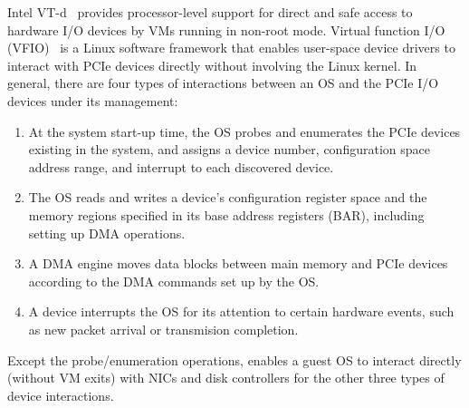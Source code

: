 Intel VT-d~\cite{intelvtd-paper} provides processor-level support for direct 
and safe access to hardware I/O devices by VMs running in non-root mode.
Virtual function I/O (VFIO)~\cite{vfio} is a Linux software framework that enables user-space
device drivers to interact with PCIe devices directly without involving the Linux kernel. 
In general, there are four types of interactions between an OS and the PCIe 
I/O devices under its management:
\begin{enumerate} 
\parskip 0mm
\itemsep 0mm
\item At the system start-up time, the OS probes and enumerates the PCIe devices existing in the system, and assigns a device number, configuration space address range, and interrupt to each discovered device.

\item The OS reads and writes a device's configuration register space and the memory regions specified in its base address registers (BAR), including setting up DMA operations.

\item A DMA engine moves data blocks between main memory and PCIe devices according to the DMA commands set up by the OS.

\item A device interrupts the OS for its attention to certain hardware events, such as new packet arrival or transmision completion.

\end{enumerate}   
Except the probe/enumeration operations, 
\na enables a guest OS to interact directly (without VM exits) with NICs and disk controllers
for the other three types of device interactions. 

